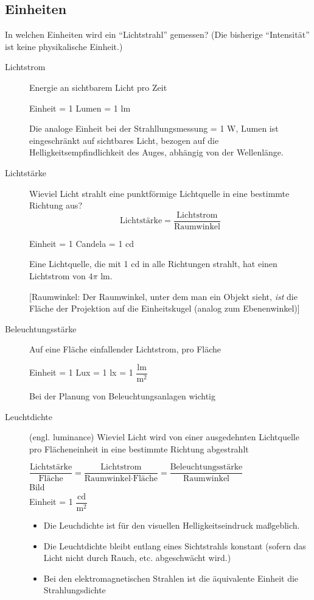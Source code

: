 \subsection{Einheiten}
In welchen Einheiten wird ein "`Lichtstrahl"' gemessen? (Die bisherige "`Intensität"' ist keine physikalische Einheit.)
\begin{description}
 \item[Lichtstrom] Energie an sichtbarem Licht pro Zeit
	\begin{center}
	 Einheit = 1 Lumen = 1 lm
	\end{center}
	Die analoge Einheit bei der Strahllungsmessung = 1 W, Lumen ist eingeschränkt auf sichtbares Licht, bezogen auf
	die Helligkeitsempfindlichkeit des Auges, abhängig von der Wellenlänge.
 \item[Lichtstärke] Wieviel Licht strahlt eine punktförmige Lichtquelle in eine bestimmte Richtung aus?
	\[\text{Lichtstärke} = \frac{\text{Lichtstrom}}{\text{Raumwinkel}}\]
	\begin{center}
	 Einheit = 1 Candela = 1 cd
	\end{center}
	Eine Lichtquelle, die mit 1 cd in alle Richtungen strahlt, hat einen Lichtstrom von $4 \pi$ lm.
	\begin{center}
	\end{center}
	[Raumwinkel: Der Raumwinkel, unter dem man ein Objekt sieht, \emph{ist} die Fläche der Projektion auf die
		Einheitskugel (analog zum Ebenenwinkel)]
	\begin{center}
	\end{center}
 \item[Beleuchtungsstärke] Auf eine Fläche einfallender Lichtstrom, pro Fläche
	\begin{center}
	 Einheit = 1 Lux = 1 lx = 1 $\dfrac{\text{lm}}{\text{m}^2}$\\[1em]
	\end{center}
	Bei der Planung von Beleuchtungsanlagen wichtig
 \item[Leuchtdichte] (engl. luminance) Wieviel Licht wird von einer ausgedehnten Lichtquelle pro Flächeneinheit
	in eine bestimmte Richtung abgestrahlt
	\begin{center}
	 $\dfrac{\text{Lichtstärke}}{\text{Fläche}} = \dfrac{\text{Lichtstrom}}{\text{Raumwinkel} \cdot \text{Fläche}}
	 = \dfrac{\text{Beleuchtungsstärke}}{\text{Raumwinkel}}$\\[1em]
	 Bild\\[1em]
	 Einheit = 1 $\dfrac{\text{cd}}{\text{m}^2}$
	\end{center}
	\begin{itemize}
	\item Die Leuchdichte ist für den visuellen Helligkeitseindruck maßgeblich.
	\item Die Leuchtdichte bleibt entlang eines Sichtstrahls konstant (sofern das Licht nicht durch Rauch, etc.
		abgeschwächt wird.)
	\item Bei den elektromagnetischen Strahlen ist die äquivalente Einheit die Strahlungsdichte
	\end{itemize}
	\begin{center}
	\end{center}
\end{description}

